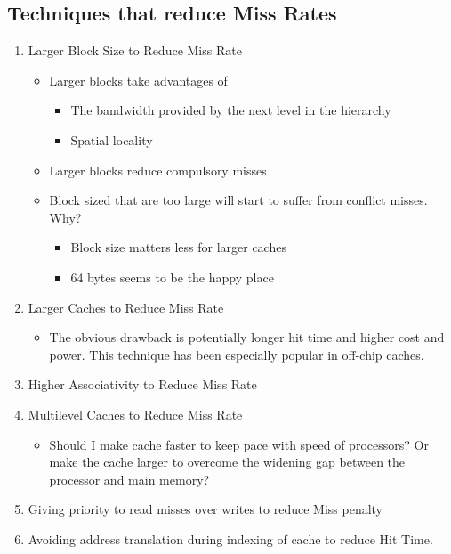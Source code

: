 \documentclass[11pt]{article}
\begin{document}
\subsection{Techniques that reduce Miss Rates}
\begin{enumerate}
    \item Larger Block Size to Reduce Miss Rate
    \begin{itemize}
        \item Larger blocks take advantages of
        \begin{itemize}
            \item The bandwidth provided by the next level in the hierarchy
            \item Spatial locality
        \end{itemize}
        \item Larger blocks reduce compulsory misses
        \item Block sized that are too large will start to suffer from conflict misses. Why?
        \begin{itemize}
            \item Block size matters less for larger caches
            \item 64 bytes seems to be the happy place
        \end{itemize}
    \end{itemize}
    \item Larger Caches to Reduce Miss Rate
        \begin{itemize}
            \item The obvious drawback is potentially longer hit time and higher cost and power. This technique has been especially popular in off-chip caches.
        \end{itemize}
    \item Higher Associativity to Reduce Miss Rate
    \item Multilevel Caches to Reduce Miss Rate
        \begin{itemize}
            \item Should I make cache faster to keep pace with speed of processors? Or make the cache larger to overcome the widening gap between the processor and main memory?
        \end{itemize}
    \item Giving priority to read misses over writes to reduce Miss penalty
    \item Avoiding address translation during indexing of cache to reduce Hit Time.
    \begin{itemize}

\end{itemize}
\end{enumerate}
\end{document}
